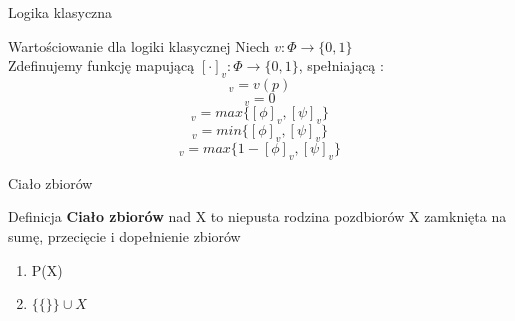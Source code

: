 \documentclass{beamer}
\begin{document}
\begin{frame}{Logika klasyczna}
 \begin{block}{Wartościowanie dla logiki klasycznej}
 Niech \( v : \Phi \rightarrow \{0,1\}\)\\
 Zdefinujemy funkcję mapującą  \( [ \cdot ]_v : \Phi \rightarrow \{ 0, 1 \}\), spełniającą :
 \begin{equation*}
 	[p]_v = v ( p)
 \end{equation*} 
 \begin{equation*}
 	[\bot]_v = 0
 \end{equation*} 
  \begin{equation*}
 	[\phi \vee \psi]_v = max\{[\phi]_v, [\psi]_v\}
 \end{equation*}
  \begin{equation*}
 	[\phi \wedge \psi]_v = min\{[\phi]_v, [\psi]_v\}
 \end{equation*}
  \begin{equation*}
 	[\phi \rightarrow \psi]_v = max\{1-[\phi]_v, [\psi]_v\}
 \end{equation*}
 	
 \end{block}
\end{frame}


\begin{frame}{Ciało zbiorów}
 \begin{block}{Definicja}
 \textbf{Ciało zbiorów} nad X to niepusta rodzina pozdbiorów X zamknięta na sumę, przecięcie i dopełnienie zbiorów
 \end{block}
 \begin{example}
 \begin{enumerate}
 \item P(X)
 \item \( \{\{\}\} \cup X\)
 \end{enumerate}
 \end{example}
\end{frame}
\end{document}
